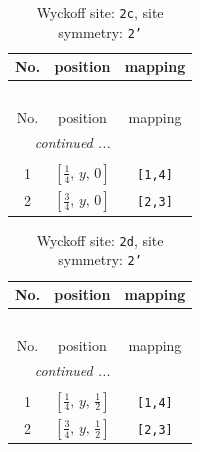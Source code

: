 \documentclass[fleqn,8pt]{jsarticle}
\begin{document}
\begin{longtable}{ccc}
\caption{Wyckoff site: {\tt 2c}, site symmetry: {\tt 2'}}
 \\
 \hline \hline
No. & position & mapping \\ \hline \endfirsthead

\multicolumn{2}{l}{\tablename\ \thetable{}} \\
 \hline \hline
No. & position & mapping \\ \hline \endhead

 \hline \hline
\multicolumn{2}{r}{\footnotesize\it continued ...} \\ \endfoot

 \hline \hline
\multicolumn{2}{r}{} \\ \endlastfoot

1 & $\left[ \frac{1}{4},\, y,\, 0 \right]$ & {\tt [1,4]} \\ \hline
2 & $\left[ \frac{3}{4},\, y,\, 0 \right]$ & {\tt [2,3]} \\
\end{longtable}
\renewcommand{\arraystretch}{1.2}
\begin{longtable}{ccc}
\caption{Wyckoff site: {\tt 2d}, site symmetry: {\tt 2'}}
 \\
 \hline \hline
No. & position & mapping \\ \hline \endfirsthead

\multicolumn{2}{l}{\tablename\ \thetable{}} \\
 \hline \hline
No. & position & mapping \\ \hline \endhead

 \hline \hline
\multicolumn{2}{r}{\footnotesize\it continued ...} \\ \endfoot

 \hline \hline
\multicolumn{2}{r}{} \\ \endlastfoot

1 & $\left[ \frac{1}{4},\, y,\, \frac{1}{2} \right]$ & {\tt [1,4]} \\ \hline
2 & $\left[ \frac{3}{4},\, y,\, \frac{1}{2} \right]$ & {\tt [2,3]} \\
\end{longtable}
\renewcommand{\arraystretch}{1.2}
\end{document}
